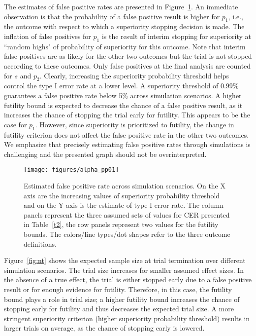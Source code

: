 \documentclass[12pt]{article}
\begin{document}
The estimates of false positive rates are presented in Figure~\ref{fig:alpha}. An immediate observation is that the probability of a false positive result is higher for $p_1$, i.e., the outcome with respect to which a superiority stopping decision is made. The inflation of false positives for $p_1$ is the result of interim stopping for superiority at ``random highs" of probability of superiority for this outcome. Note that interim false positives are as likely for the other two outcomes but the trial is not stopped according to these outcomes. Only false positives at the final analysis are counted for $s$ and $p_2$. Clearly, increasing the superiority probability threshold helps control the type I error rate at a lower level. A superiority threshold of 0.99\% guarantees a false positive rate below 5\% across simulation scenarios. A higher futility bound is expected to decrease the chance of a false positive result, as it increases the chance of stopping the trial early for futility. This appears to be the case for $p_1$. However, since superiority is prioritized to futility, the change in futility criterion does not affect the false positive rate in the other two outcomes. We emphasize that precisely estimating false positive rates through simulations is challenging and the presented graph should not be overinterpreted. 

\begin{figure}[t]
	
	\centering
	\texttt{[image: figures/alpha\_pp01]}
	\caption{Estimated false positive rate across simulation scenarios. On the X axis are the increasing values of superiority probability threshold and on the Y axis is the estimate of type I error rate. The column panels represent the three assumed sets of values for CER presented in Table~\ref{t2}, the row panels represent two values for the futility bounds. The colors/line types/dot shapes refer to the three outcome definitions.}
	\label{fig:alpha}
	
\end{figure}

Figure~\ref{fig:nt} shows the expected sample size at trial termination over different simulation scenarios. The trial size increases for smaller assumed effect sizes. In the absence of a true effect, the trial is either stopped early due to a false positive result or for enough evidence for futility. Therefore, in this case, the futility bound plays a role in trial size; a higher futility bound increases the chance of stopping early for futility and thus decreases the expected  trial size. A more stringent superiority criterion (higher superiority probability threshold) results in larger trials on average, as the chance of stopping early is lowered.
\end{document}
